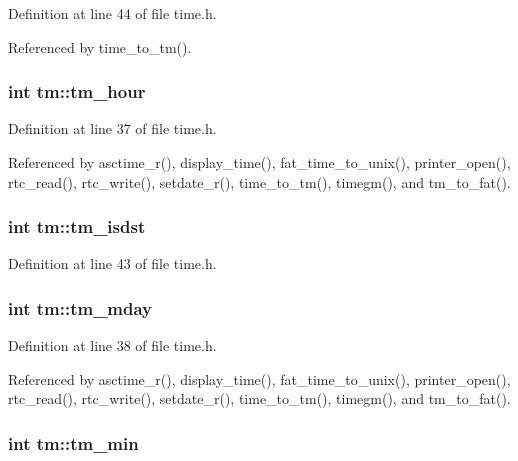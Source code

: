 Definition at line 44 of file time.\-h.



Referenced by time\-\_\-to\-\_\-tm().

\hypertarget{structtm_a3e7ca4e37f1abcaf56b8a916c38eb9fe}{
\subsubsection[{tm\-\_\-hour}]{\setlength{\rightskip}{0pt plus 5cm}int tm\-::tm\-\_\-hour}}\label{structtm_a3e7ca4e37f1abcaf56b8a916c38eb9fe}


Definition at line 37 of file time.\-h.



Referenced by asctime\-\_\-r(), display\-\_\-time(), fat\-\_\-time\-\_\-to\-\_\-unix(), printer\-\_\-open(), rtc\-\_\-read(), rtc\-\_\-write(), setdate\-\_\-r(), time\-\_\-to\-\_\-tm(), timegm(), and tm\-\_\-to\-\_\-fat().

\hypertarget{structtm_a5645ca0580c8ab2c24f6c2965d9c9f9c}{
\subsubsection[{tm\-\_\-isdst}]{\setlength{\rightskip}{0pt plus 5cm}int tm\-::tm\-\_\-isdst}}\label{structtm_a5645ca0580c8ab2c24f6c2965d9c9f9c}


Definition at line 43 of file time.\-h.

\hypertarget{structtm_ab8d8904bad43b0c8b96e61941c5b5310}{
\subsubsection[{tm\-\_\-mday}]{\setlength{\rightskip}{0pt plus 5cm}int tm\-::tm\-\_\-mday}}\label{structtm_ab8d8904bad43b0c8b96e61941c5b5310}


Definition at line 38 of file time.\-h.



Referenced by asctime\-\_\-r(), display\-\_\-time(), fat\-\_\-time\-\_\-to\-\_\-unix(), printer\-\_\-open(), rtc\-\_\-read(), rtc\-\_\-write(), setdate\-\_\-r(), time\-\_\-to\-\_\-tm(), timegm(), and tm\-\_\-to\-\_\-fat().

\hypertarget{structtm_af414eb7c86cc3099595211eee4d4211b}{
\subsubsection[{tm\-\_\-min}]{\setlength{\rightskip}{0pt plus 5cm}int tm\-::tm\-\_\-min}}\label{structtm_af414eb7c86cc3099595211eee4d4211b}


